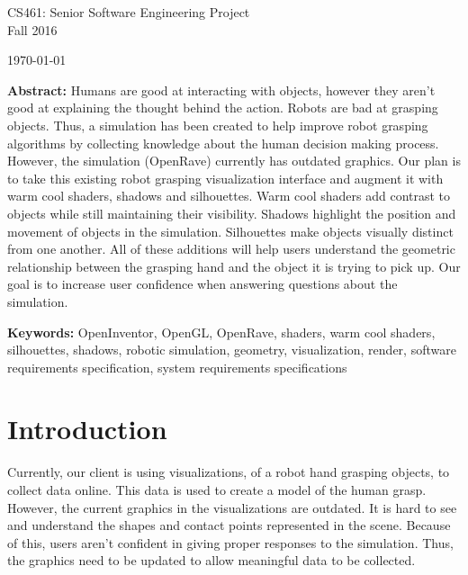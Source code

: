\documentclass[10pt,journal,compsoc]{IEEEtran}
\begin{document}
\begin{titlepage}
\begin{flushleft}
\begin{bfseries}
\end{bfseries}

\vspace{15mm}
\Large{CS461: Senior Software Engineering Project} \\
\Large{Fall 2016} \\

\vspace{10mm}

\today

\vfill

\begin{normalsize}
{\bf Abstract:}
Humans are good at interacting with objects, however they aren't good at explaining the thought behind the action.
Robots are bad at grasping objects.
Thus, a simulation has been created to help improve robot grasping algorithms by collecting knowledge about the human decision making process.
However, the simulation (OpenRave) currently has outdated graphics.
Our plan is to take this existing robot grasping visualization interface and augment it with warm cool shaders, shadows and silhouettes.
Warm cool shaders add contrast to objects while still maintaining their visibility.
Shadows highlight the position and movement of objects in the simulation.
Silhouettes make objects visually distinct from one another.
All of these additions will help users understand the geometric relationship between the grasping hand and the object it is trying to pick up. 
Our goal is to increase user confidence when answering questions about the simulation.

{\bf Keywords:} OpenInventor, OpenGL, OpenRave, shaders, warm cool shaders, silhouettes, shadows, robotic simulation, geometry, visualization, render,
software requirements specification, system requirements specifications
\end{normalsize}
\end{flushleft}

\newpage

\end{titlepage}

\section*{Introduction}
\vspace{3mm}
Currently, our client is using visualizations, of a robot hand grasping objects, to collect data online.
This data is used to create a model of the human grasp.
However, the current graphics in the visualizations are outdated.
It is hard to see and understand the shapes and contact points represented in the scene.
Because of this, users aren't confident in giving proper responses to the simulation.
Thus, the graphics need to be updated to allow meaningful data to be collected. \\
\end{document}
